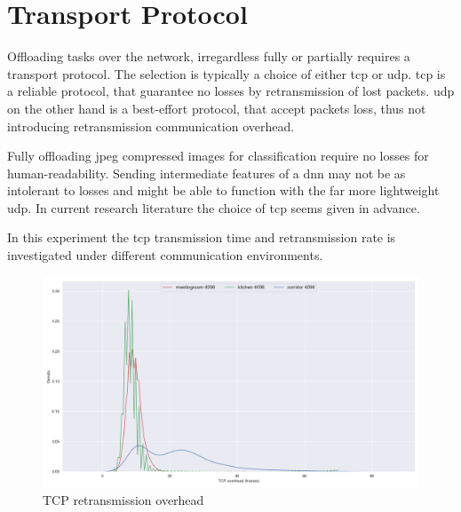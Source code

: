 \section{Transport Protocol} 

Offloading tasks over the network, irregardless fully or partially requires a transport protocol. The selection is typically a choice of either \gls{tcp} or \gls{udp}. \gls{tcp} is a reliable protocol, that guarantee no losses by retransmission of lost packets. \gls{udp} on the other hand is a best-effort protocol, that accept packets loss, thus not introducing retransmission communication overhead. 


Fully offloading \gls{jpeg} compressed images for classification require no losses for human-readability. Sending intermediate features of a \gls{dnn} may not be as intolerant to losses and might be able to function with the far more lightweight \gls{udp}. In current research literature the choice of \gls{tcp} seems given in advance.  

In this experiment the \gls{tcp} transmission time and retransmission rate is investigated under different communication environments. 

\begin{figure}
	\centering
	\includegraphics[width=\linewidth]{figures/tcp/tcpoverhead}
	\caption[TCP retransmission overhead]{TCP retransmission overhead}
\end{figure}